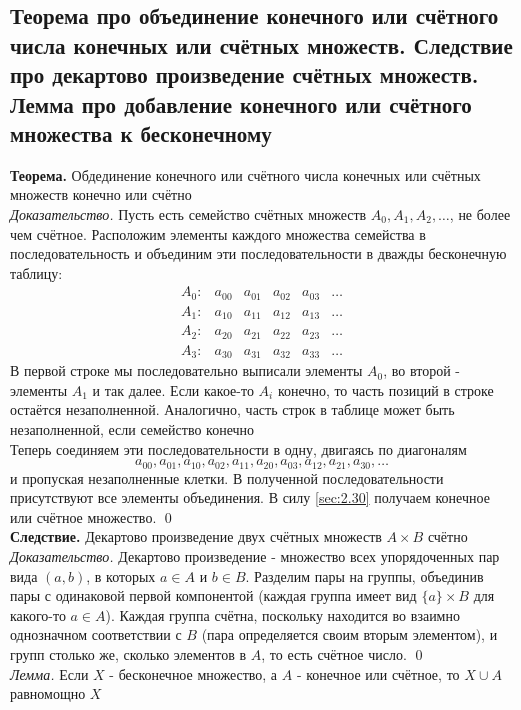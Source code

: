 \documentclass[a4paper]{article}
\begin{document}
\subsection{Теорема про объединение конечного или счётного числа конечных или счётных множеств. Следствие про декартово произведение счётных множеств. Лемма про добавление конечного или счётного множества к бесконечному}
\textbf{Теорема.} Обдединение конечного или счётного числа конечных или счётных множеств конечно или счётно\\[2mm]
\textit{Доказательство.} Пусть есть семейство счётных множеств $A_{0}, A_{1}, A_{2}, \ldots$, не более чем счётное. Расположим элементы каждого множества семейства в последовательность и объединим эти последовательности в дважды бесконечную таблицу:
$$
\begin{array}{llllll}
A_{0}: & a_{00} & a_{01} & a_{02} & a_{03} & \ldots \\
A_{1}: & a_{10} & a_{11} & a_{12} & a_{13} & \ldots \\
A_{2}: & a_{20} & a_{21} & a_{22} & a_{23} & \ldots \\
A_{3}: & a_{30} & a_{31} & a_{32} & a_{33} & \ldots
\end{array}
$$
 В первой строке мы последовательно выписали элементы $A_{0}$, во второй - элементы $A_{1}$ и так далее. Если какое-то $A_{i}$ конечно, то часть позиций в строке остаётся незаполненной. Аналогично, часть строк в таблице может быть незаполненной, если семейство конечно\\[2mm]
 Теперь соединяем эти последовательности в одну, двигаясь по диагоналям
$$
a_{00}, a_{01}, a_{10}, a_{02}, a_{11}, a_{20}, a_{03}, a_{12}, a_{21}, a_{30}, \ldots
$$
и пропуская незаполненные клетки. В полученной последовательности присутствуют все элементы объединения. В силу \ref{sec:2.30} получаем конечное или счётное множество. \qed\\[2mm]
\textbf{Следствие.} Декартово произведение двух счётных множеств $A \times B$ счётно\\[2mm]
\textit{Доказательство.} Декартово произведение - множество всех упорядоченных пар вида $(a, b)$, в которых $a \in A$ и $b \in B$. Разделим пары на группы, объединив пары с одинаковой первой компонентой (каждая группа имеет вид $\{a\} \times B$ для какого-то $a \in A$). Каждая группа счётна, поскольку находится во взаимно однозначном соответствии с $B$ (пара определяется своим вторым элементом), и групп столько же, сколько элементов в $A$, то есть счётное число. \qed\\[2mm]
\textit{Лемма.} Если $X$ - бесконечное множество, а $A$ - конечное или счётное, то $X \cup A$ равномощно $X$\\[2mm]
\end{document}
